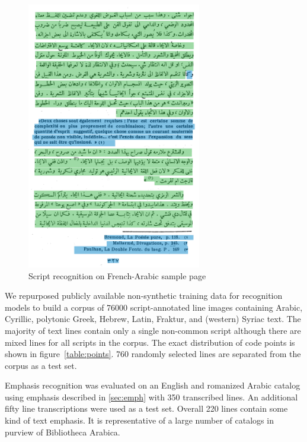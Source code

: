 \begin{figure}
	\includegraphics[width=0.68\textwidth]{high.png}
	\caption{Script recognition on French-Arabic sample page}
	\label{fig:read_high}
\end{figure}
We repurposed publicly available non-synthetic training data for recognition
models to build a corpus of 76000 script-annotated line images containing
Arabic, Cyrillic, polytonic Greek, Hebrew, Latin, Fraktur, and (western) Syriac
text. The majority of text lines contain only a single non-common script
although there are mixed lines for all scripts in the corpus. The exact
distribution of code points is shown in figure~\ref{table:points}. 760 randomly
selected lines are separated from the corpus as a test set.

Emphasis recognition was evaluated on an English and romanized Arabic catalog
using emphasis described in \ref{sec:emph} with 350 transcribed lines. An
additional fifty line tran\-scriptions were used as a test set. Over\-all 220 lines
contain some kind of text emphasis. It is representative of a large number of
catalogs in purview of Bibliotheca Arabica.

